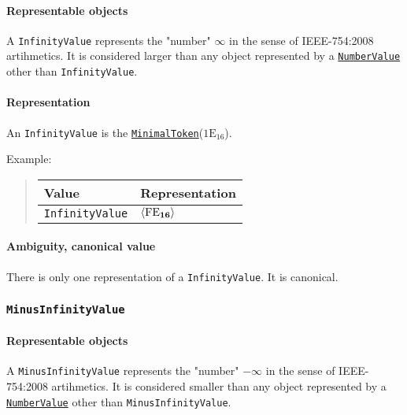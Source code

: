 \documentclass{dbor-article}
\newcommand{\HexNumber}[1]{\mathrm{#1}_{16}}
\newcommand{\DborSyntaxIdent}[1]{\texttt{#1}}
\newcommand{\DborSyntaxIdentRef}[1]{\hyperlink{sec:def:#1}{\DborSyntaxIdent{#1}}}
\newcommand{\DborFirstByte}[2]{\mathbf{\textcolor{#1}{\HexNumber{#2}}}}
\newcommand{\DborFirstByteNumber}[1]{\DborFirstByte{black}{#1}}
\begin{document}
    \paragraph{Representable objects}

    A \DborSyntaxIdent{InfinityValue} represents the "number" $\infty$ in the sense of IEEE-754:2008 artihmetics.
    It is considered larger than any object represented by a \DborSyntaxIdentRef{NumberValue} 
    other than \DborSyntaxIdent{InfinityValue}.

    \paragraph{Representation}

    An \DborSyntaxIdent{InfinityValue} is the \DborSyntaxIdentRef{MinimalToken}($\HexNumber{1E}$).

    \smallskip
    \noindent
    Example:
    \nolinebreak
    \begin{quote}    
        \begin{tabular}{ll}
            \toprule
            Value & Representation \\
            \midrule
            \DborSyntaxIdent{InfinityValue} 
                & $\langle \DborFirstByteNumber{FE} \rangle$ \\
            \bottomrule
        \end{tabular}
    \end{quote}

    \paragraph{Ambiguity, canonical value}

    There is only one representation of a \DborSyntaxIdent{InfinityValue}.
    It is canonical.


    \subsubsection{\DborSyntaxIdent{MinusInfinityValue}}
    \label{sec:def:MinusInfinityValue}
    \hypertarget{sec:def:MinusInfinityValue}{}

    \paragraph{Representable objects}

    A \DborSyntaxIdent{MinusInfinityValue} represents the "number" $-\infty$ in the sense of IEEE-754:2008 artihmetics.
    It is considered smaller than any object represented by a \DborSyntaxIdentRef{NumberValue} 
    other than \DborSyntaxIdent{MinusInfinityValue}.
\end{document}
